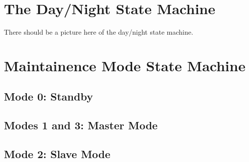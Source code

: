 \hypertarget{statemachines_daynight_sm}{}\section{The Day/\+Night State Machine}\label{statemachines_daynight_sm}
There should be a picture here of the day/night state machine.\hypertarget{statemachines_mmode_sm}{}\section{Maintainence Mode State Machine}\label{statemachines_mmode_sm}
 \hypertarget{statemachines_standbymode}{}\subsection{Mode 0\+: Standby}\label{statemachines_standbymode}
\hypertarget{statemachines_mastermode}{}\subsection{Modes 1 and 3\+: Master Mode}\label{statemachines_mastermode}
\hypertarget{statemachines_slavemode}{}\subsection{Mode 2\+: Slave Mode}\label{statemachines_slavemode}
